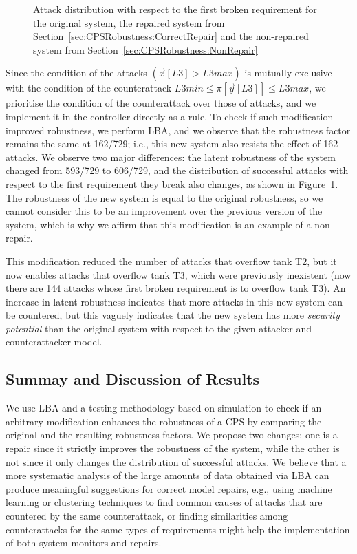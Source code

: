 {{\begin{figure}[t]
  \caption{Attack distribution with respect to the first broken requirement for the original system, the repaired system from Section~\ref{sec:CPSRobustness:CorrectRepair} and the non-repaired system from Section~\ref{sec:CPSRobustness:NonRepair}}
  \label{fig:CPSRobustness:AttackDistribution}
\end{figure} 
Since the condition of the attacks $(\vec{x}[L3]>L3max)$ is mutually exclusive with the condition of the counterattack $L3min \leq \pi[\vec{y}[L3]]\leq L3max$, we prioritise the condition of the counterattack over those of attacks, and we implement it in the controller directly as a rule. To check if such modification improved robustness, we perform LBA, and we observe that the robustness factor remains the same at 162/729; i.e., this new system also resists the effect of 162 attacks. We observe two major differences: the latent robustness of the system changed from 593/729 to 606/729, and the distribution of successful attacks with respect to the first requirement they break also changes, as shown in Figure~\ref{fig:CPSRobustness:AttackDistribution}. The robustness of the new system is equal to the original robustness, so we cannot consider this to be an improvement over the previous version of the system, which is why we affirm that this modification is an example of a non-repair. 

This modification reduced the number of attacks that overflow tank T2, but it now enables attacks that overflow tank T3, which were previously inexistent (now there are 144 attacks whose first broken requirement is to overflow tank T3). An increase in latent robustness indicates that more attacks in this new system can be countered, but this vaguely indicates that the new system has more \emph{security potential} than the original system with respect to the given attacker and counterattacker model.



\subsection{Summay and Discussion of Results}
We use LBA and a testing methodology based on simulation to check if an arbitrary modification enhances the robustness of a CPS by comparing the original and the resulting robustness factors. We propose two changes: one is a repair since it strictly improves the robustness of the system, while the other is not since it only changes the distribution of successful attacks. We believe that a more systematic analysis of the large amounts of data obtained via LBA can produce meaningful suggestions for correct model repairs, e.g., using machine learning or clustering techniques to find common causes of attacks that are countered by the same counterattack, or finding similarities among counterattacks for the same types of requirements might help the implementation of both system monitors and repairs. 

}}
